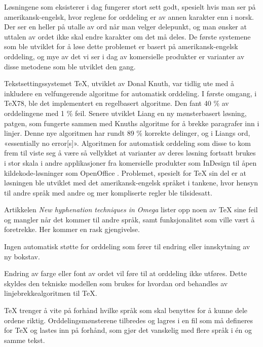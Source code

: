 Løsningene som eksisterer i dag fungerer stort sett godt, spesielt hvis man ser på amerikansk-engelsk, hvor reglene for orddeling er av annen karakter enn i norsk. Der ser en heller på utalle av ord når man velger delepunkt, og man ønsker at uttalen av ordet ikke skal endre karakter om det må deles. De første systemene som ble utviklet for å løse dette problemet er basert på amerikansk-engelsk orddeling, og mye av det vi ser i dag av komersielle produkter er varianter av disse metodene som ble utviklet den gang.

Tekstsettingssystemet \TeX{}, utviklet av Donal Knuth, var tidlig ute med å inkludere en velfungerende algoritme for automatisk orddeling. I første omgang, i \TeX{}78, ble det implementert en regelbasert algoritme. Den fant 40 \% av orddelingene med 1 \% feil. \cite{sojka1995hyphenation} Senere utviklet Liang en ny mønsterbasert løsning, patgen, som fungerte sammen med Knuths algoritme for å brekke paragrafer inn i linjer. Denne nye algoritmen har rundt 89 \% korrekte delinger, og i Liangs ord, «essentially no error[s]». \cite{liang1983word} Algoritmen for automatisk orddeling som disse to kom frem til viste seg å være så vellykket at varianter av deres løsning fortsatt brukes i stor skala i andre applikasjoner fra komersielle produkter som InDesign \cite{liang1983word} til åpen kildekode-løsninger som OpenOffice \cite{nemeth2006automatic}. Problemet, spesielt for \TeX{} sin del er at løsningen ble utviklet med det amerikansk-engelsk språket i tankene, hvor hensyn til andre språk med andre og mer kompliserte regler ble tilsidesatt.

Artikkelen \textit{New hyphenation techniques in Omega} \cite{omega} lister opp noen av \TeX{} sine feil og mangler når det kommer til andre språk, samt funksjonalitet som ville vært å foretrekke. Her kommer en rask gjengivelse.

\begin{items}
\item Ingen automatisk støtte for orddeling som fører til endring eller innskytning av ny bokstav. 

	\newline

\item Endring av farge eller font av ordet vil føre til at orddeling ikke utføres. Dette skyldes den tekniske modellen som brukes for hvordan ord behandles av linjebrekkealgoritmen til \TeX{}.
\item \TeX{} trenger å vite på forhånd hvilke språk som skal benyttes for å kunne dele ordene riktig. Orddelingsmønsterene tilbredes og lagres i en fil som må defineres for \TeX{} og lastes inn på forhånd, som gjør det vanskelig med flere språk i én og samme tekst.
\end{items}

